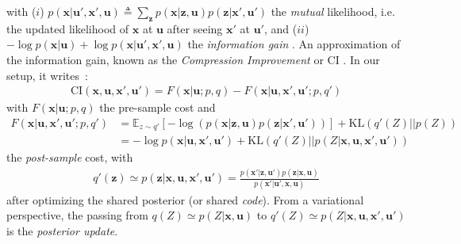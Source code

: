 \documentclass{article}
\begin{document}
with 
($i$) $ p(\boldsymbol{x}| \boldsymbol{u}', \boldsymbol{x}', \boldsymbol{u}) \triangleq \sum_{\boldsymbol{z}} p(\boldsymbol{x}|\boldsymbol{z}, \boldsymbol{u}) p(\boldsymbol{z}|\boldsymbol{x}', \boldsymbol{u}')$ 
the \emph{mutual} likelihood, i.e. the updated likelihood of $\boldsymbol{x}$ at $\boldsymbol{u}$ after seeing $\boldsymbol{x}'$ at $\boldsymbol{u}'$,
and ($ii$) 
$-\log p(\boldsymbol{x}| \boldsymbol{u}) + \log p(\boldsymbol{x}| \boldsymbol{u}', \boldsymbol{x}', \boldsymbol{u})$ the 
\emph{information gain} \citep{tishby2011information}.
An approximation of the information gain, known as the \emph{Compression Improvement} or CI \citep{schmidhuber2007simple,houthooft2016vime}. In our setup, it
writes~:
\begin{align}
\text{CI}(\boldsymbol{x},\boldsymbol{u}, \boldsymbol{x}', \boldsymbol{u}') = F(\boldsymbol{x}|\boldsymbol{u};p,q) - F(\boldsymbol{x}|\boldsymbol{u}, \boldsymbol{x}', \boldsymbol{u}';p,q') 
\end{align}	
with $F(\boldsymbol{x}|\boldsymbol{u};p,q)$ the pre-sample cost and  
\begin{align}
F(\boldsymbol{x}|\boldsymbol{u}, \boldsymbol{x}', \boldsymbol{u}';p,q') &= 
\mathbb{E}_{z\sim q'} \left[-\log (p(\boldsymbol{x}|\boldsymbol{z}, \boldsymbol{u}) p(\boldsymbol{z}|\boldsymbol{x}', \boldsymbol{u}'))\right] +\text{KL}(q'(Z)||p(Z))\label{eq:CI-prior}\\
&= -\log p(\boldsymbol{x}| \boldsymbol{u}, \boldsymbol{x}', \boldsymbol{u}') + \text{KL}(q'(Z)||p(Z|\boldsymbol{x}, \boldsymbol{u}, \boldsymbol{x}', \boldsymbol{u}'))\label{eq:CI-post}
\end{align}
the \emph{post-sample} cost, with 
\begin{align}
q'(\boldsymbol{z}) \simeq p(\boldsymbol{z}|\boldsymbol{x}, \boldsymbol{u}, \boldsymbol{x}', \boldsymbol{u}') = \frac{p(\boldsymbol{x}'|\boldsymbol{z}, \boldsymbol{u}')p(\boldsymbol{z}|\boldsymbol{x}, \boldsymbol{u})}{p(\boldsymbol{x}'|\boldsymbol{u}',\boldsymbol{x},\boldsymbol{u})}
\end{align} 
after optimizing the shared posterior (or shared \emph{code}). From a variational perspective, the passing from $q(Z) \simeq p(Z|\boldsymbol{x}, \boldsymbol{u})$ to $q'(Z) \simeq p(Z|\boldsymbol{x}, \boldsymbol{u}, \boldsymbol{x}', \boldsymbol{u}')$ is the \emph{posterior update}.
\end{document}
